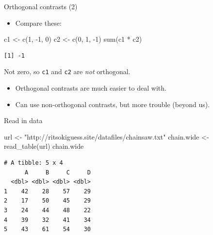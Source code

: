 \documentclass[
  ignorenonframetext,
]{beamer}
\newenvironment{Shaded}{\begin{snugshade}}{\end{snugshade}}
\newcommand{\DecValTok}[1]{\textcolor[rgb]{0.68,0.00,0.00}{#1}}
\newcommand{\FunctionTok}[1]{\textcolor[rgb]{0.28,0.35,0.67}{#1}}
\newcommand{\NormalTok}[1]{\textcolor[rgb]{0.00,0.23,0.31}{#1}}
\newcommand{\OtherTok}[1]{\textcolor[rgb]{0.00,0.23,0.31}{#1}}
\newcommand{\SpecialCharTok}[1]{\textcolor[rgb]{0.37,0.37,0.37}{#1}}
\newcommand{\StringTok}[1]{\textcolor[rgb]{0.13,0.47,0.30}{#1}}
\providecommand{\tightlist}{%
  \setlength{\itemsep}{0pt}\setlength{\parskip}{0pt}}\usepackage{longtable,booktabs,array}
\begin{document}
\begin{frame}[fragile]{Orthogonal contrasts (2)}
\protect\hypertarget{orthogonal-contrasts-2}{}
\begin{itemize}
\tightlist
\item
  Compare these:
\end{itemize}

\normalsize

\begin{Shaded}
\begin{Highlighting}[]
\NormalTok{c1 }\OtherTok{\textless{}{-}} \FunctionTok{c}\NormalTok{(}\DecValTok{1}\NormalTok{, }\SpecialCharTok{{-}}\DecValTok{1}\NormalTok{, }\DecValTok{0}\NormalTok{)}
\NormalTok{c2 }\OtherTok{\textless{}{-}} \FunctionTok{c}\NormalTok{(}\DecValTok{0}\NormalTok{, }\DecValTok{1}\NormalTok{, }\SpecialCharTok{{-}}\DecValTok{1}\NormalTok{)}
\FunctionTok{sum}\NormalTok{(c1 }\SpecialCharTok{*}\NormalTok{ c2)}
\end{Highlighting}
\end{Shaded}

\begin{verbatim}
[1] -1
\end{verbatim}

\normalsize

Not zero, so \texttt{c1} and \texttt{c2} are \emph{not} orthogonal.

\begin{itemize}
\item
  Orthogonal contrasts are much easier to deal with.
\item
  Can use non-orthogonal contrasts, but more trouble (beyond us).
\end{itemize}
\end{frame}

\begin{frame}[fragile]{Read in data}
\protect\hypertarget{read-in-data}{}
\small

\begin{Shaded}
\begin{Highlighting}[]
\NormalTok{url }\OtherTok{\textless{}{-}} \StringTok{"http://ritsokiguess.site/datafiles/chainsaw.txt"}
\NormalTok{chain.wide }\OtherTok{\textless{}{-}} \FunctionTok{read\_table}\NormalTok{(url)}
\NormalTok{chain.wide}
\end{Highlighting}
\end{Shaded}

\begin{verbatim}
# A tibble: 5 x 4
      A     B     C     D
  <dbl> <dbl> <dbl> <dbl>
1    42    28    57    29
2    17    50    45    29
3    24    44    48    22
4    39    32    41    34
5    43    61    54    30
\end{verbatim}

\normalsize
\end{frame}
\end{document}
